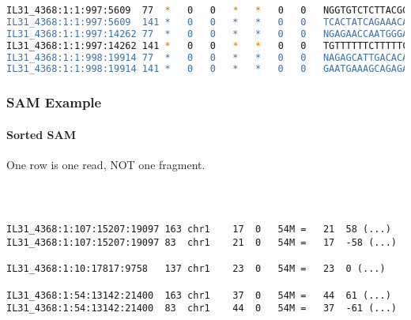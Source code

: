 \documentclass{beamer}
\begin{document}
\begin{frame}[fragile]
\begin{framed}
\begin{lstlisting}[language=bash,basicstyle=\tiny]
IL31_4368:1:1:997:5609	77	*	0	0	*	*	0	0	NGGTGTCTCTTACGGACAGCATTAAGCTAGATTCTTTTTAGACCGATCTGCCAA	(*+*&,1426<;@@??@>?9@@@<@4>>?>666260.)-*9;;;8>:>'0<418
IL31_4368:1:1:997:5609	141	*	0	0	*	*	0	0	TCACTATCAGAAACAGAATGTATAACTTCCAAATCAGTAGGAAACACAAGGAAA	AEECECBEC@A;AC=<AEEEEAEEEE>AC,CE?ECCE9EAEC4E:<C>AC@EE)
IL31_4368:1:1:997:14262	77	*	0	0	*	*	0	0	NGAGAACCAATGGGAAGCAGCCTGAGCTGCTGGAACCTATTCCCCATGACTTCA	(9136242-2@@@;96.>>>@@@@>0$<><>>2623.':**+3*03137..--.
IL31_4368:1:1:997:14262	141	*	0	0	*	*	0	0	TGTTTTTTCTTTTTCTTTTTTTTTTGACAGTGCAGAGATTTTTTATCTTTTTAA	97'<2<.64.?7/3(891?=(6??6+<6<++/*..3(:'/'9::''&(1<>.(,
IL31_4368:1:1:998:19914	77	*	0	0	*	*	0	0	NAGAGCATTGACACACATAAAAAATTAAAACAACCCTTTGTACTTACGGTAGAA	(/892<<>55@>>?<><<<7..())@@@;<<<22>65267<<@@<8>>..3;/$
IL31_4368:1:1:998:19914	141	*	0	0	*	*	0	0	GAATGAAAGCAGAGACCCTGATCGAGCCCCAGAAAGATACACCTCCAGATTTTA	C?=CECE4CD<?8@==;EBE<=0@:@@92@???6<991>.<?A=@5?@99;971
\end{lstlisting}
\end{framed}
\end{frame}


\begin{frame}[fragile]
\frametitle{SAM Example}
\framesubtitle{Sorted SAM}
One row is one read, NOT one fragment.
\begin{framed}\tiny
\begin{verbatim}



IL31_4368:1:107:15207:19097	163	chr1	17	0	54M	=	21	58 (...)
IL31_4368:1:107:15207:19097	83	chr1	21	0	54M	=	17	-58 (...)

IL31_4368:1:10:17817:9758	137	chr1	23	0	54M	=	23	0 (...)

IL31_4368:1:54:13142:21400	163	chr1	37	0	54M	=	44	61 (...)
IL31_4368:1:54:13142:21400	83	chr1	44	0	54M	=	37	-61 (...)


\end{verbatim}
\end{framed}
\end{frame}
\end{document}
